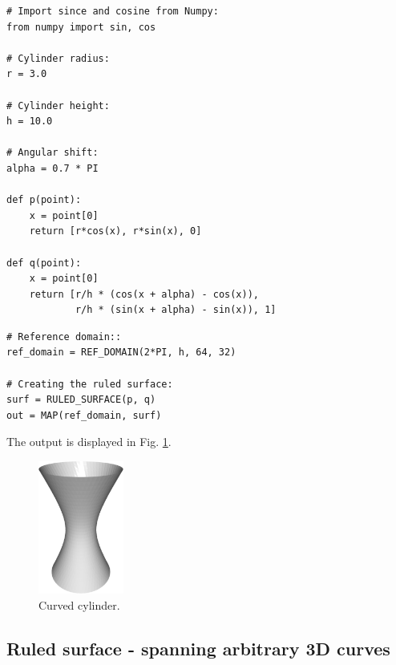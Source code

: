 \begin{bbox}
\begin{verbatim}
# Import since and cosine from Numpy:
from numpy import sin, cos

# Cylinder radius:
r = 3.0

# Cylinder height:
h = 10.0

# Angular shift:
alpha = 0.7 * PI

def p(point):
    x = point[0]
    return [r*cos(x), r*sin(x), 0]
  
def q(point):
    x = point[0]
    return [r/h * (cos(x + alpha) - cos(x)), 
            r/h * (sin(x + alpha) - sin(x)), 1]
\end{verbatim}
\end{bbox}

\begin{bbox}
\begin{verbatim}
# Reference domain::  
ref_domain = REF_DOMAIN(2*PI, h, 64, 32)

# Creating the ruled surface:
surf = RULED_SURFACE(p, q)
out = MAP(ref_domain, surf)
\end{verbatim}
\end{bbox}
\vspace{6mm}

\noindent
The output is displayed in Fig. \ref{fig:curves-9}.

\begin{figure}[!ht]
\begin{center}
\includegraphics[width=0.25\textwidth]{img/curves-9.png}
\end{center}
\vspace{-4mm}
\caption{Curved cylinder.}
\label{fig:curves-9}
\end{figure}

\subsection{Ruled surface - spanning arbitrary 3D curves}

